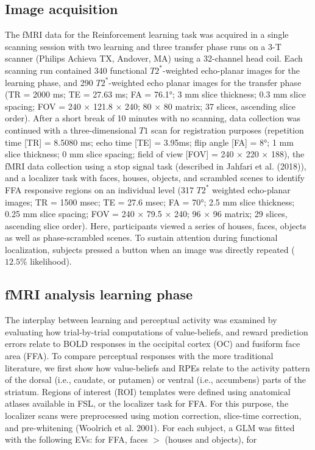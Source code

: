\documentclass[]{article}
\begin{document}
\hypertarget{image-acquisition}{%
\subsection{Image acquisition}\label{image-acquisition}}

The fMRI data for the Reinforcement learning task was acquired in a
single scanning session with two learning and three transfer phase runs
on a 3-T scanner (Philips Achieva TX, Andover, MA) using a 32-channel
head coil. Each scanning run contained 340 functional
\(T2^{*}\)-weighted echo-planar images for the learning phase, and 290
\(T2^{*}\)-weighted echo planar images for the transfer phase (TR = 2000
ms; TE = 27.63 ms; FA = 76.1°; 3 mm slice thickness; 0.3 mm slice
spacing; FOV = 240 × 121.8 × 240; 80 × 80 matrix; 37 slices, ascending
slice order). After a short break of 10 minutes with no scanning, data
collection was continued with a three-dimensional \(T1\) scan for
registration purposes (repetition time {[}TR{]} = 8.5080 ms; echo time
{[}TE{]} = 3.95ms; flip angle {[}FA{]} = 8°; 1 mm slice thickness; 0 mm
slice spacing; field of view {[}FOV{]} = 240 × 220 × 188), the fMRI data
collection using a stop signal task (described in Jahfari et al.
(2018)), and a localizer task with faces, houses, objects, and scrambled
scenes to identify FFA responsive regions on an individual level (317
\(T2^{*}\) weighted echo-planar images; TR = 1500 msec; TE = 27.6 msec;
FA = 70°; 2.5 mm slice thickness; 0.25 mm slice spacing; FOV = 240 ×
79.5 × 240; 96 × 96 matrix; 29 slices, ascending slice order). Here,
participants viewed a series of houses, faces, objects as well as
phase-scrambled scenes. To sustain attention during functional
localization, subjects pressed a button when an image was directly
repeated (\(12.5\%\) likelihood).

\hypertarget{fmri-analysis-learning-phase}{%
\subsection{fMRI analysis learning
phase}\label{fmri-analysis-learning-phase}}

The interplay between learning and perceptual activity was examined by
evaluating how trial-by-trial computations of value-beliefs, and reward
prediction errors relate to BOLD responses in the occipital cortex (OC)
and fusiform face area (FFA). To compare perceptual responses with the
more traditional literature, we first show how value-beliefs and RPEs
relate to the activity pattern of the dorsal (i.e., caudate, or putamen)
or ventral (i.e., accumbens) parts of the striatum. Regions of interest
(ROI) templates were defined using anatomical atlases available in FSL,
or the localizer task for FFA. For this purpose, the localizer scans
were preprocessed using motion correction, slice-time correction, and
pre-whitening (Woolrich et al. 2001). For each subject, a GLM was fitted
with the following EVs: for FFA, faces \(>\) (houses and objects), for
\end{document}
